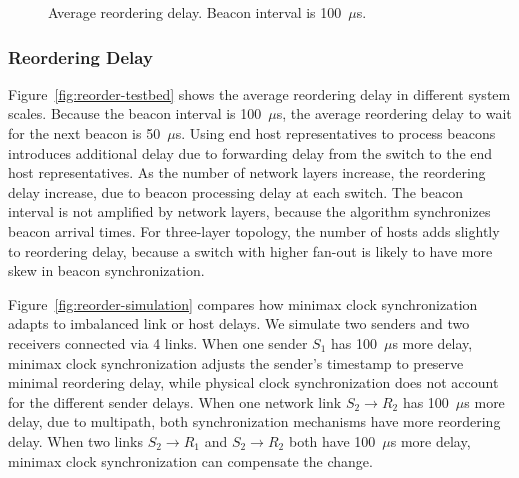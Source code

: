 \begin{figure}[t]
\centering
	\hspace{0.01\textwidth}
	\caption{Average reordering delay. Beacon interval is 100~$\mu$s.}
    \vspace{-5pt}
\label{fig:reorder-delay}
\end{figure}

\subsubsection{Reordering Delay}
\label{sec:eval-delay}

Figure~\ref{fig:reorder-testbed} shows the average reordering delay in different system scales. Because the beacon interval is 100~$\mu$s, the average reordering delay to wait for the next beacon is 50~$\mu$s. Using end host representatives to process beacons introduces additional delay due to forwarding delay from the switch to the end host representatives. As the number of network layers increase, the reordering delay increase, due to beacon processing delay at each switch. The beacon interval is not amplified by network layers, because the algorithm synchronizes beacon arrival times. For three-layer topology, the number of hosts adds slightly to reordering delay, because a switch with higher fan-out is likely to have more skew in beacon synchronization.

Figure~\ref{fig:reorder-simulation} compares how minimax clock synchronization adapts to imbalanced link or host delays. We simulate two senders and two receivers connected via 4 links. When one sender $S_1$ has 100~$\mu$s more delay, minimax clock synchronization adjusts the sender's timestamp to preserve minimal reordering delay, while physical clock synchronization does not account for the different sender delays. When one network link $S_2 \rightarrow R_2$ has 100~$\mu$s more delay, due to multipath, both synchronization mechanisms have more reordering delay. When two links $S_2 \rightarrow R_1$ and $S_2 \rightarrow R_2$ both have 100~$\mu$s more delay, minimax clock synchronization can compensate the change.



